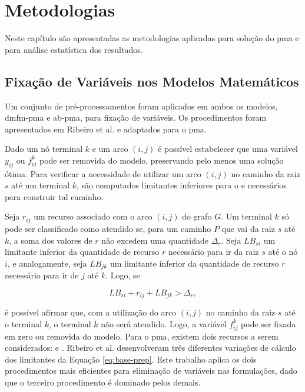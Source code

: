 \chapter{Metodologias} \label{chapter:metodologia}

Neste  capítulo  são apresentadas  as  metodologias  aplicadas para  solução  do
\gls{pma} e para análise estatística dos resultados.

\section{Fixação de Variáveis nos Modelos Matemáticos} \label{sec:prep-modelos}

Um  conjunto  de  pré-processamentos  foram   aplicados  em  ambos  os  modelos,
\gls{dmfm-pma} e \gls{ab-pma}, para fixação de variáveis. Os procedimentos foram
apresentados em Ribeiro et al. \cite{tiago:2019} e adaptados para o \gls{pma}.

Dado  um nó  terminal $k$  e um  arco $(i,  j)$ é  possível estabelecer  que uma
variável $y_{ij}$ ou $f_{ij}^{k}$ pode  ser removida do modelo, preservando pelo
menos uma solução  ótima. Para verificar a necessidade de  utilizar um arco $(i,
j)$  no caminho  da raiz  $s$  até um  terminal $k$,  são computados  limitantes
inferiores para o {\delay} e {\jitter} necessários para construir tal caminho.

Seja $r_{ij}$ um recurso associado com o arco $(i, j)$ do grafo $G$. Um terminal
$k$ só pode  ser classificado como atendido  se, para um caminho $P$  que vai da
raiz  $s$  até $k$,  a  soma  dos valores  de  $r$  não excedem  uma  quantidade
$\Delta_r$. Seja  $LB_{si}$ um limitante  inferior da quantidade de  recurso $r$
necessário para ir da  raiz $s$ até o nó $i$, e  analogamente, seja $LB_{jk}$ um
limitante inferior  da quantidade de recurso  $r$ necessário para ir  de $j$ até
$k$. Logo, se

\begin{equation}
LB_{si} + r_{ij} + LB_{jk} > \Delta_r, \label{eq:base-prep}
\end{equation}

é possível afirmar que, com a utilização do arco $(i, j)$ no caminho da raiz $s$
até  o  terminal  $k$, o  terminal  $k$  não  será  atendido. Logo,  a  variável
$f_{ij}^{k}$ pode  ser fixada em zero  ou removida do modelo.  Para o \gls{pma},
existem dois recursos a serem considerados: {\delay} e {\jitter}. Ribeiro et al.
\cite{tiago:2019}  desenvolveram  três  diferentes   variações  de  cálculo  dos
limitantes  da  Equação  \eqref{eq:base-prep}.  Este  trabalho  aplica  os  dois
procedimentos mais eficientes para eliminação de variáveis nas formulações, dado
que o terceiro procedimento é dominado pelos demais.

